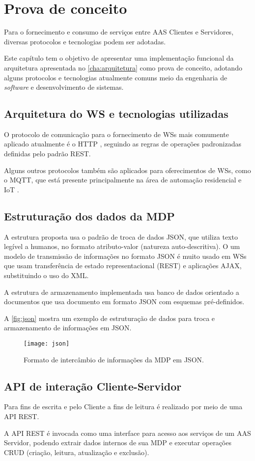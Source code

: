 \chapter{Prova de conceito}
\label{cha:prova-de-conceito}

	Para o fornecimento e consumo de serviços entre AAS Clientes e Servidores, diversas protocolos e tecnologias podem ser adotadas.
	
	Este capítulo tem o objetivo de apresentar uma implementação funcional da arquitetura apresentada no \autoref{cha:arquitetura} como prova de conceito, adotando alguns protocolos e tecnologias atualmente comuns meio da engenharia de \textit{software} e desenvolvimento de sistemas.
	

\section{ Arquitetura do WS e tecnologias utilizadas }

	O protocolo de comunicação para o fornecimento de WSs mais comumente aplicado atualmente é o HTTP \cite{gruner2016restful}, seguindo as regras de operações padronizadas definidas pelo padrão REST.
	
	Alguns outros protocolos também são aplicados para oferecimentos de WSs, como o MQTT, que está presente principalmente na área de automação residencial e IoT \cite{yokotani2016mqtt}.


\section{ Estruturação dos dados da MDP }

	A estrutura proposta usa o padrão de troca de dados JSON, que utiliza texto legível a humanos, no formato atributo-valor (natureza auto-descritiva). O um modelo de transmissão de informações no formato JSON é muito usado em WSs que usam transferência de estado representacional (REST) e aplicações AJAX, substituindo o uso do XML.
	
	A estrutura de armazenamento implementada usa banco de dados orientado a documentos que usa documento em formato JSON com esquemas pré-definidos.
	
	A \autoref{fig:json} mostra um exemplo de estruturação de dados para troca e armazenamento de informações em JSON.
	
	\begin{figure}[htb]
		\centering
		\caption{Formato de intercâmbio de informações da MDP em JSON.}
		\label{fig:json}
		\texttt{[image: json]}
	\end{figure}

	
\section{ API de interação Cliente-Servidor }

	Para fins de escrita e pelo Cliente a fins de leitura é realizado por meio de uma API REST.
	
	A API REST é invocada como uma interface para acesso aos serviços de um AAS Servidor, podendo extrair dados internos de sua MDP e executar operações CRUD (criação, leitura, atualização e exclusão).
	